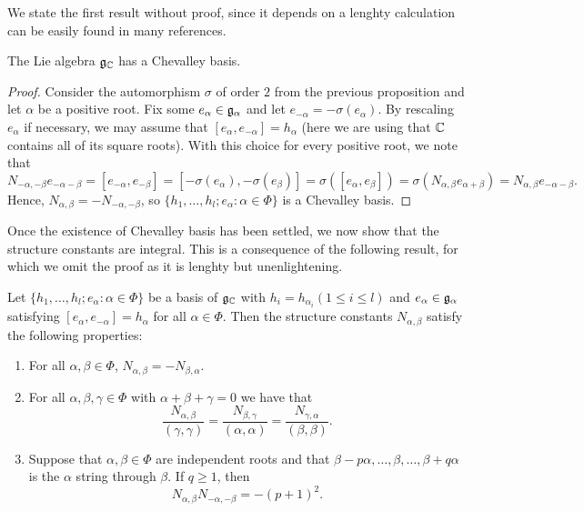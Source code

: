 We state the first result without proof, since it depends on a lenghty calculation can be easily found in many references.

\begin{cor}[Chevalley, 1955]\label{cor:chevalleybasis}
    The Lie algebra $\mathfrak{g}_{\mathbb{C}}$ has a Chevalley basis.
\end{cor}
\begin{proof}
    Consider the automorphism $\sigma$ of order $2$ from the previous proposition and let $\alpha$ be a positive root. Fix some $e_\alpha\in\mathfrak{g}_\alpha$ and let $e_{-\alpha}=-\sigma(e_\alpha)$. By rescaling $e_\alpha$ if necessary, we may assume that $[e_\alpha,e_{-\alpha}]=h_\alpha$ (here we are using that $\mathbb{C}$ contains all of its square roots). With this choice for every positive root, we note that 
    $$N_{-\alpha,-\beta}e_{-\alpha-\beta}=[e_{-\alpha},e_{-\beta}]=[-\sigma(e_\alpha),-\sigma(e_\beta)]=\sigma([e_\alpha,e_\beta])=\sigma(N_{\alpha,\beta}e_{\alpha+\beta})=N_{\alpha,\beta}e_{-\alpha-\beta}.$$
    Hence, $N_{\alpha,\beta}=-N_{-\alpha,-\beta}$, so $\{h_1,\ldots,h_l;e_\alpha:\alpha\in\Phi\}$ is a Chevalley basis.
\end{proof}

Once the existence of Chevalley basis has been settled, we now show that the structure constants are integral. This is a consequence of the following result, for which we omit the proof as it is lenghty but unenlightening. 

\begin{theorem}
    Let $\{h_1,\ldots,h_l;e_\alpha:\alpha\in\Phi\}$ be a basis of $\mathfrak{g}_{\mathbb{C}}$ with $h_i=h_{\alpha_i}(1\leq i\leq l)$ and $e_\alpha\in\mathfrak{g}_\alpha$ satisfying $[e_\alpha,e_{-\alpha}]=h_\alpha$ for all $\alpha\in\Phi$. Then the structure constants $N_{\alpha,\beta}$ satisfy the following properties:
    \begin{enumerate}
        \item For all $\alpha,\beta\in\Phi$, $N_{\alpha,\beta}=-N_{\beta,\alpha}$.
        \item For all $\alpha,\beta,\gamma\in\Phi$ with $\alpha+\beta+\gamma=0$ we have that 
        $$\frac{N_{\alpha,\beta}}{(\gamma,\gamma)}=\frac{N_{\beta,\gamma}}{(\alpha,\alpha)}=\frac{N_{\gamma,\alpha}}{(\beta,\beta)}.$$
        \item Suppose that $\alpha,\beta\in\Phi$ are independent roots and that $\beta-p\alpha,\ldots,\beta,\ldots,\beta+q\alpha$ is the $\alpha$ string through $\beta$. If $q\geq1$, then 
        $$N_{\alpha,\beta}N_{-\alpha,-\beta}=-(p+1)^2.$$
    \end{enumerate}
\end{theorem}

